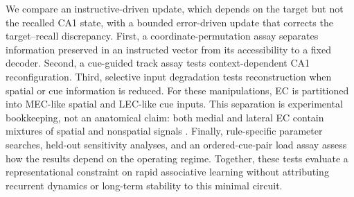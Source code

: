 We compare an instructive-driven update, which depends on the target but not
the recalled CA1 state, with a bounded error-driven update that corrects the
target--recall discrepancy. First, a coordinate-permutation assay separates
information preserved in an instructed vector from its accessibility to a
fixed decoder. Second, a cue-guided track assay tests context-dependent CA1
reconfiguration. Third, selective input degradation tests reconstruction
when spatial or cue information is reduced. For these manipulations, EC is
partitioned into MEC-like spatial and LEC-like cue inputs. This separation is
experimental bookkeeping, not an anatomical claim: both medial and lateral
EC contain mixtures of spatial and nonspatial signals
\citep{hargreaves2005,henriksen2010,deshmukh2011,dorian2026a}.
Finally, rule-specific parameter searches, held-out sensitivity analyses,
and an ordered-cue-pair load assay assess how the results depend on the
operating regime. Together, these tests evaluate a representational constraint
on rapid associative learning without attributing recurrent dynamics or
long-term stability to this minimal circuit.
